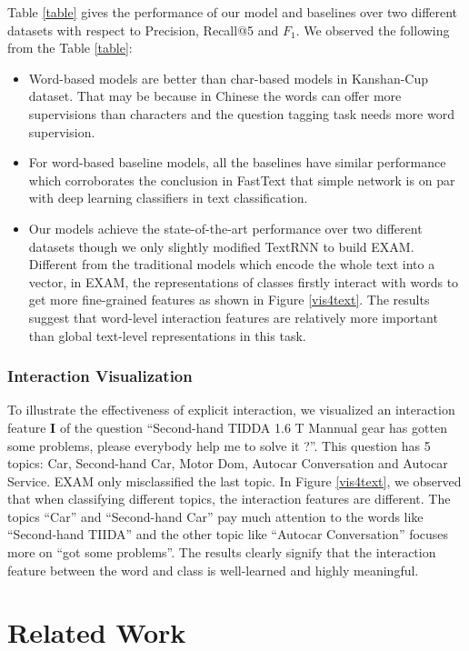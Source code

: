 \documentclass[letterpaper]{article} \usepackage{aaai19}  \usepackage{times}  \usepackage{helvet}  \usepackage{courier}  \usepackage{url}  \usepackage{graphicx}
\begin{document}
Table \ref{table} gives the performance of our model and baselines over two different datasets with respect to Precision, Recall@5 and $F_{1}$. We observed the following from the Table \ref{table}:
\begin{itemize}
\item Word-based models are better than char-based models in Kanshan-Cup dataset. That may be because in Chinese the words can offer more supervisions than characters and the question tagging task needs more word supervision.
\item  For word-based baseline models, all the baselines have similar performance which corroborates the conclusion in FastText \cite{fasttext} that simple network is on par with deep learning classifiers in text classification.
\item Our models achieve the state-of-the-art performance over two different datasets though we only slightly modified TextRNN to build EXAM. Different from the traditional models which encode the whole text into a vector, in EXAM, the representations of classes firstly interact with  words to get more fine-grained features as shown in Figure \ref{vis4text}. The results suggest that word-level interaction features are relatively more important than global text-level representations in this task.
\end{itemize}


\subsubsection{Interaction Visualization}
To illustrate the effectiveness of explicit interaction, we visualized an interaction feature \textbf{I} of the question ``Second-hand TIDDA 1.6 T Mannual gear has gotten some problems, please everybody help me to solve it ?''. This question has 5 topics: Car, Second-hand Car, Motor Dom, Autocar Conversation and Autocar Service. EXAM only misclassified the last topic. In  Figure \ref{vis4text}, we observed that  when classifying different topics, the interaction features are different. The topics ``Car'' and ``Second-hand Car'' pay much attention to the words like ``Second-hand TIIDA'' and the other topic like ``Autocar Conversation'' focuses more on  ``got some problems''. The results clearly signify that the interaction feature between the word and class is well-learned and highly meaningful.

\section{Related Work}
\end{document}
